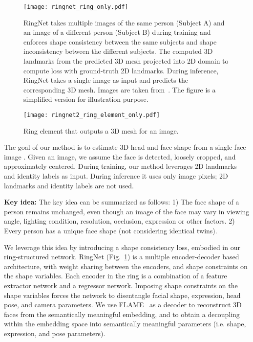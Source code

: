 \label{sec:losses}


\begin{figure}[t]
	\centerline{
		\texttt{[image: ringnet\_ring\_only.pdf]} 
	}
\caption{RingNet takes multiple images of the same person (Subject A) and an image of a different person (Subject B) during training and enforces shape consistency between the same subjects and shape inconsistency between the different subjects. The computed 3D landmarks from the predicted 3D mesh projected into 2D domain to compute loss with ground-truth 2D landmarks. During inference, RingNet takes a single image as input and predicts the corresponding 3D mesh. Images are taken from~\cite{Cao18}. The figure is a simplified version for illustration purpose.}
	\label{fig:ringnet}
\end{figure}

\begin{figure}[t]
	\centerline{
		\texttt{[image: ringnet2\_ring\_element\_only.pdf]} 
	}
	\caption{Ring element that outputs a 3D mesh for an image.}
	\label{fig:ringnet_element}
\end{figure}



The goal of our method is to estimate 3D head and face shape from a single face image . 
Given an image, we assume the face is detected, loosely cropped, and approximately centered. 
During training, our method leverages 2D landmarks and identity labels as input.
During inference it uses only image pixels; 2D landmarks and identity labels are not used.




\textbf{Key idea:} The key idea can be summarized as follows: 1) The face shape of a person remains unchanged, even though an image of the face may vary in viewing angle, lighting condition, resolution, occlusion, expression or other factors. 2) Every person has a unique face shape (not considering identical twins). 


We leverage this idea by introducing a shape consistency loss, embodied in our ring-structured network. RingNet (Fig.~\ref{fig:ringnet}) is a multiple encoder-decoder based architecture, with weight sharing between the encoders, and shape constraints on the shape variables. Each encoder in the ring is a combination of a feature extractor network and a regressor network. Imposing shape constraints on the shape variables forces the network to disentangle facial shape, expression, head pose, and camera parameters. We use FLAME~\cite{Bolkart1} as a decoder to reconstruct 3D faces from the semantically meaningful embedding, and to obtain a decoupling within the embedding space into semantically meaningful parameters (i.e. shape, expression, and pose parameters). 

